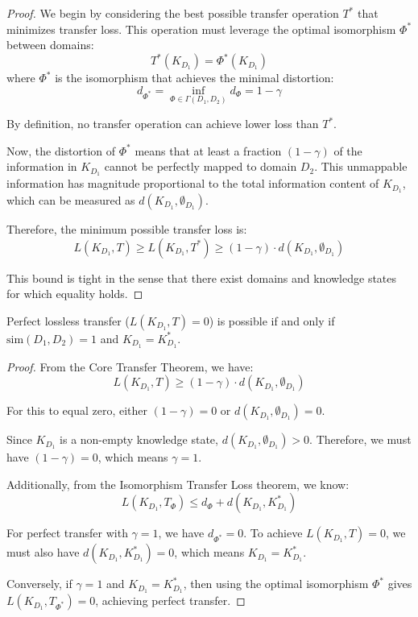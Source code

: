 \begin{proof}
We begin by considering the best possible transfer operation $T^*$ that minimizes transfer loss. This operation must leverage the optimal isomorphism $\Phi^*$ between domains:
\begin{equation}
T^*(K_{D_1}) = \Phi^*(K_{D_1})
\end{equation}
where $\Phi^*$ is the isomorphism that achieves the minimal distortion:
\begin{equation}
d_{\Phi^*} = \inf_{\Phi \in \Gamma(D_1, D_2)} d_{\Phi} = 1 - \gamma
\end{equation}

By definition, no transfer operation can achieve lower loss than $T^*$.

Now, the distortion of $\Phi^*$ means that at least a fraction $(1 - \gamma)$ of the information in $K_{D_1}$ cannot be perfectly mapped to domain $D_2$. This unmappable information has magnitude proportional to the total information content of $K_{D_1}$, which can be measured as $d(K_{D_1}, \emptyset_{D_1})$.

Therefore, the minimum possible transfer loss is:
\begin{equation}
L(K_{D_1}, T) \geq L(K_{D_1}, T^*) \geq (1 - \gamma) \cdot d(K_{D_1}, \emptyset_{D_1})
\end{equation}

This bound is tight in the sense that there exist domains and knowledge states for which equality holds.
\end{proof}

\begin{corollary}
Perfect lossless transfer ($L(K_{D_1}, T) = 0$) is possible if and only if $\text{sim}(D_1, D_2) = 1$ and $K_{D_1} = K_{D_1}^*$.
\end{corollary}

\begin{proof}
From the Core Transfer Theorem, we have:
\begin{equation}
L(K_{D_1}, T) \geq (1 - \gamma) \cdot d(K_{D_1}, \emptyset_{D_1})
\end{equation}

For this to equal zero, either $(1 - \gamma) = 0$ or $d(K_{D_1}, \emptyset_{D_1}) = 0$.

Since $K_{D_1}$ is a non-empty knowledge state, $d(K_{D_1}, \emptyset_{D_1}) > 0$. Therefore, we must have $(1 - \gamma) = 0$, which means $\gamma = 1$.

Additionally, from the Isomorphism Transfer Loss theorem, we know:
\begin{equation}
L(K_{D_1}, T_{\Phi}) \leq d_{\Phi} + d(K_{D_1}, K_{D_1}^*)
\end{equation}

For perfect transfer with $\gamma = 1$, we have $d_{\Phi^*} = 0$. To achieve $L(K_{D_1}, T) = 0$, we must also have $d(K_{D_1}, K_{D_1}^*) = 0$, which means $K_{D_1} = K_{D_1}^*$.

Conversely, if $\gamma = 1$ and $K_{D_1} = K_{D_1}^*$, then using the optimal isomorphism $\Phi^*$ gives $L(K_{D_1}, T_{\Phi^*}) = 0$, achieving perfect transfer.
\end{proof}

